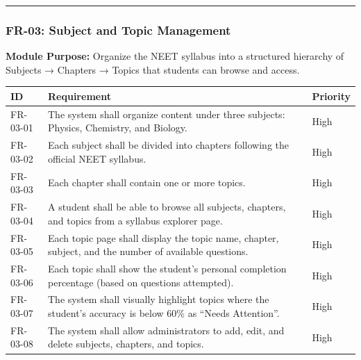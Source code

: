 \documentclass[
]{article}
\begin{document}
\begin{center}\rule{0.5\linewidth}{0.5pt}\end{center}

\subsubsection{FR-03: Subject and Topic
Management}\label{fr-03-subject-and-topic-management}

\textbf{Module Purpose:} Organize the NEET syllabus into a structured
hierarchy of Subjects → Chapters → Topics that students can browse and
access.

\begin{longtable}[]{@{}
  >{\raggedright\arraybackslash}p{}
  >{\raggedright\arraybackslash}p{}
  >{\raggedright\arraybackslash}p{}@{}}
\toprule\noalign{}
\begin{minipage}[b]{\linewidth}\raggedright
ID
\end{minipage} & \begin{minipage}[b]{\linewidth}\raggedright
Requirement
\end{minipage} & \begin{minipage}[b]{\linewidth}\raggedright
Priority
\end{minipage} \\
\midrule\noalign{}
\endhead
\bottomrule\noalign{}
\endlastfoot
FR-03-01 & The system shall organize content under three subjects:
Physics, Chemistry, and Biology. & High \\
FR-03-02 & Each subject shall be divided into chapters following the
official NEET syllabus. & High \\
FR-03-03 & Each chapter shall contain one or more topics. & High \\
FR-03-04 & A student shall be able to browse all subjects, chapters, and
topics from a syllabus explorer page. & High \\
FR-03-05 & Each topic page shall display the topic name, chapter,
subject, and the number of available questions. & High \\
FR-03-06 & Each topic shall show the student's personal completion
percentage (based on questions attempted). & High \\
FR-03-07 & The system shall visually highlight topics where the
student's accuracy is below 60\% as ``Needs Attention''. & High \\
FR-03-08 & The system shall allow administrators to add, edit, and
delete subjects, chapters, and topics. & High \\
\end{longtable}
\end{document}
